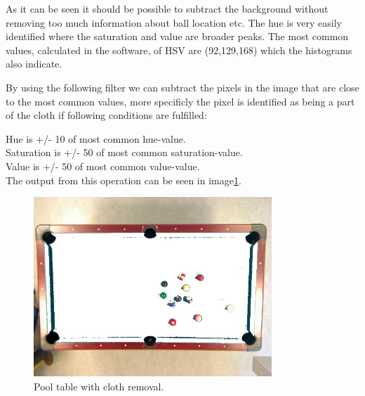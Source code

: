 As it can be seen it should be possible to subtract the background without removing too much information about ball location etc. The hue is very easily identified where the saturation and value are broader peaks.
The most common values, calculated in the software, of HSV are (92,129,168) which the histograms also indicate.

By using the following filter we can subtract the pixels in the image that are close to the most common values, more specificly the pixel is identified as being a part of the cloth if following conditions are fulfilled:

Hue is +/- 10 of most common hue-value.\\
Saturation is +/- 50 of most common saturation-value.\\
Value is +/- 50 of most common value-value.\\

The output from this operation can be seen in image\ref{fig:poolclothremoval}.

\begin{figure}[H]
\begin{center}
\leavevmode
\includegraphics[width=0.8\textwidth]{images/table-remove-cloth.jpg}
\end{center}
\caption{Pool table with cloth removal.}
\label{fig:poolclothremoval}
\end{figure}




